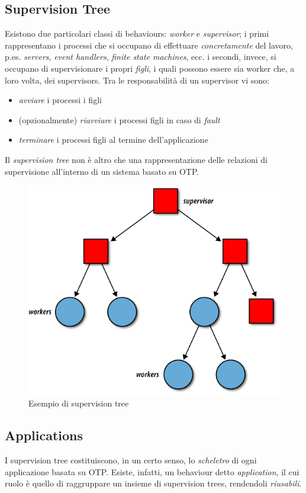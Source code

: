 %
\subsection{Supervision Tree}
%
Esistono due particolari classi di behaviours: \emph{worker} e \emph{supervisor}\cite{otpsupervisor}; 
%
i primi rappresentano i processi che si occupano di effettuare \emph{concretamente} del lavoro, 
p.es. \emph{servers}, \emph{event handlers}, \emph{finite state machines}, ecc.
%
i secondi, invece, si occupano di supervisionare i propri \emph{figli}, i quali possono essere sia
worker che, a loro volta, dei supervisors. 
%
Tra le responsabilit\`a di un supervisor vi sono:
\begin{itemize}
\item \emph{avviare} i processi i figli
\item (opzionalmente) \emph{riavviare} i processi figli in caso di \emph{fault}
\item \emph{terminare} i processi figli al termine dell'applicazione
\end{itemize}
%

%
Il \emph{supervision tree} non \`e altro che una rappresentazione delle relazioni di supervisione 
all'interno di un sistema basato su OTP.
%
\begin{figure}[!h]
\centering
\includegraphics[width=350pt]{img/supervision-tree.png}
\caption{Esempio di supervision tree}
\end{figure}
%

%

%
\subsection{Applications}
%
I supervision tree costituiscono, in un certo senso, lo \emph{scheletro} di ogni applicazione
basata su OTP. Esiste, infatti, un behaviour detto \emph{application}\cite{otpapplication}, 
il cui ruolo \`e quello di raggruppare un insieme di supervision trees, rendendoli 
\emph{riusabili}. 
%


